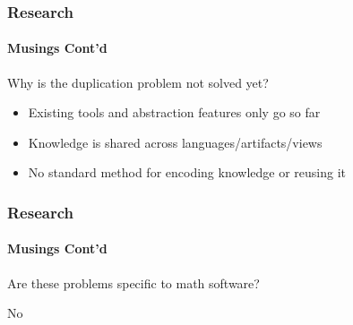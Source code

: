 \documentclass{beamer}
\begin{document}
\begin{frame}

\frametitle{Research}
\framesubtitle{Musings Cont'd}

Why is the duplication problem not solved yet? 

\begin{itemize}
\item Existing tools and abstraction features only go so far
\item Knowledge is shared across languages/artifacts/views

\item No standard method for encoding knowledge or reusing it
\end{itemize}

\end{frame}

\begin{frame}

\frametitle{Research}
\framesubtitle{Musings Cont'd}

Are these problems specific to math software?

\Huge{No}

\end{frame}
\end{document}
